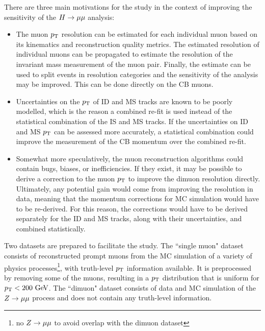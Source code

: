 There are three main motivations for the study in the context of
improving the sensitivity of the $H \rightarrow \mu\mu$ analysis:
\begin{itemize}
\item The muon $p_{\text{T}}$ resolution can be estimated for each individual muon
based on its kinematics and reconstruction quality metrics. The estimated
resolution of individual muons can be propagated to estimate the resolution
of the invariant mass measurement of the muon pair. Finally, the estimate
can be used to split events in resolution categories and the sensitivity of
the analysis may be improved. This can be done directly on the CB muons.

\item Uncertainties on the $p_{\text{T}}$ of ID and MS tracks are known to be
poorly modelled, which is the reason a combined re-fit is used instead of
the statistical combination of the IS and MS tracks. If the uncertainties
on ID and MS $p_{\text{T}}$ can be assessed more accurately, a statistical
combination could improve the measurement of the CB momentum over the
combined re-fit.

\item Somewhat more speculatively, the muon reconstruction
algorithms could contain bugs, biases, or inefficiencies. If they exist,
it may be possible to 
derive a correction to the muon $p_{\text{T}}$ to improve the dimuon resolution
directly. Ultimately, any potential gain would come from improving the
resolution in data, meaning that the momentum corrections for MC
simulation would have to be re-derived. For this reason, the
corrections would have to be derived separately for the ID and MS
tracks, along with their uncertainties, and combined statistically.
\end{itemize}
Two datasets are prepared to facilitate the study. The ``single muon"
dataset consists of reconstructed prompt muons from the MC simulation
of a variety of physics processes\footnote{no $Z \rightarrow \mu\mu$ to avoid overlap
with the dimuon dataset}, with truth-level $p_{\text{T}}$ information
available. It is preprocessed by removing some of the muons, resulting
in a $p_{\text{T}}$ distribution that is uniform for $p_{\text{T}} < 200~\text{Ge\kern -0.1em V}$. The ``dimuon"
dataset consists of data and MC simulation of the $Z \rightarrow \mu\mu$ process
and does not contain any truth-level information.

